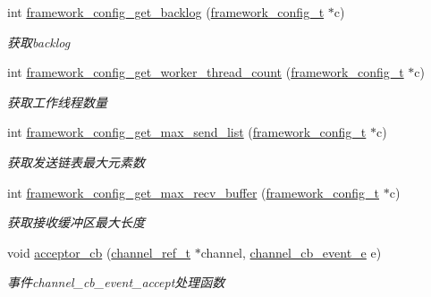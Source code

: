 \begin{DoxyCompactItemize}
int \hyperlink{a00049_a7e20403dae6bc1195d506af7909641b4_a7e20403dae6bc1195d506af7909641b4}{framework\+\_\+config\+\_\+get\+\_\+backlog} (\hyperlink{a00047_a55b26efa9e6ee05514d087ba2593a54b_a55b26efa9e6ee05514d087ba2593a54b}{framework\+\_\+config\+\_\+t} $\ast$c)
\begin{DoxyCompactList}\small\item\em 获取backlog \end{DoxyCompactList}\item 
int \hyperlink{a00049_aca3f6b57e6c3e601ddf2ecd8d536aa32_aca3f6b57e6c3e601ddf2ecd8d536aa32}{framework\+\_\+config\+\_\+get\+\_\+worker\+\_\+thread\+\_\+count} (\hyperlink{a00047_a55b26efa9e6ee05514d087ba2593a54b_a55b26efa9e6ee05514d087ba2593a54b}{framework\+\_\+config\+\_\+t} $\ast$c)
\begin{DoxyCompactList}\small\item\em 获取工作线程数量 \end{DoxyCompactList}\item 
int \hyperlink{a00049_a5fdcaba78c9cbaa69f506d5eed77ca3b_a5fdcaba78c9cbaa69f506d5eed77ca3b}{framework\+\_\+config\+\_\+get\+\_\+max\+\_\+send\+\_\+list} (\hyperlink{a00047_a55b26efa9e6ee05514d087ba2593a54b_a55b26efa9e6ee05514d087ba2593a54b}{framework\+\_\+config\+\_\+t} $\ast$c)
\begin{DoxyCompactList}\small\item\em 获取发送链表最大元素数 \end{DoxyCompactList}\item 
int \hyperlink{a00049_a1e7e3927ce054f250cd3d87fe9d2705d_a1e7e3927ce054f250cd3d87fe9d2705d}{framework\+\_\+config\+\_\+get\+\_\+max\+\_\+recv\+\_\+buffer} (\hyperlink{a00047_a55b26efa9e6ee05514d087ba2593a54b_a55b26efa9e6ee05514d087ba2593a54b}{framework\+\_\+config\+\_\+t} $\ast$c)
\begin{DoxyCompactList}\small\item\em 获取接收缓冲区最大长度 \end{DoxyCompactList}\item 
void \hyperlink{a00049_a4ef7d97742bc9410f486ebc4e0b75e82_a4ef7d97742bc9410f486ebc4e0b75e82}{acceptor\+\_\+cb} (\hyperlink{a00047_a151271c9d188ef28d4d24bb81dcc1263_a151271c9d188ef28d4d24bb81dcc1263}{channel\+\_\+ref\+\_\+t} $\ast$channel, \hyperlink{a00047_aaf2cba5d4035f3d56350b59342ebf65c_aaf2cba5d4035f3d56350b59342ebf65c}{channel\+\_\+cb\+\_\+event\+\_\+e} e)
\begin{DoxyCompactList}\small\item\em 事件channel\+\_\+cb\+\_\+event\+\_\+accept处理函数 \end{DoxyCompactList}\item 

\end{DoxyCompactItemize}
